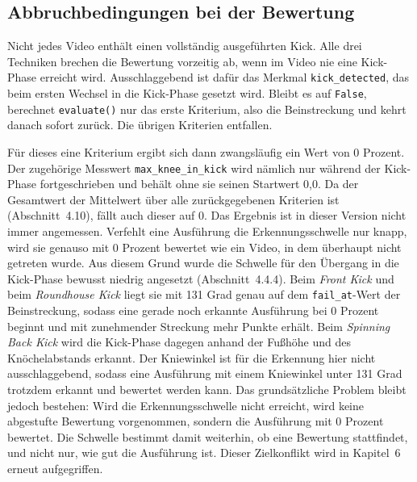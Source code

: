 \documentclass[intern]{cgMA}
\begin{document}
\subsection{Abbruchbedingungen bei der Bewertung}
Nicht jedes Video enthält einen vollständig ausgeführten Kick. Alle drei Techniken brechen die Bewertung vorzeitig ab, wenn im Video nie eine Kick-Phase erreicht wird. Ausschlaggebend ist dafür das Merkmal \texttt{kick\_detected}, das beim ersten Wechsel in die Kick-Phase gesetzt wird. Bleibt es auf \texttt{False}, berechnet \texttt{evaluate()} nur das erste Kriterium, also die Beinstreckung und kehrt danach sofort zurück. Die übrigen Kriterien entfallen.

Für dieses eine Kriterium ergibt sich dann zwangsläufig ein Wert von 0 Prozent. Der zugehörige Messwert \texttt{max\_knee\_in\_kick} wird nämlich nur während der Kick-Phase fortgeschrieben und behält ohne sie seinen Startwert 0,0. Da der Gesamtwert der Mittelwert über alle zurückgegebenen Kriterien ist (Abschnitt~4.10), fällt auch dieser auf 0.
Das Ergebnis ist in dieser Version nicht immer angemessen. Verfehlt eine Ausführung die Erkennungsschwelle nur knapp, wird sie genauso mit 0 Prozent bewertet wie ein Video, in dem überhaupt nicht getreten wurde. Aus diesem Grund wurde die Schwelle für den Übergang in die Kick-Phase bewusst niedrig angesetzt (Abschnitt~4.4.4). Beim \textit{Front Kick} und beim \textit{Roundhouse Kick} liegt sie mit 131 Grad genau auf dem \texttt{fail\_at}-Wert der Beinstreckung, sodass eine gerade noch erkannte Ausführung bei 0 Prozent beginnt und mit zunehmender Streckung mehr Punkte erhält. 
Beim \textit{Spinning Back Kick} wird die Kick-Phase dagegen anhand der Fußhöhe und des Knöchelabstands erkannt. Der Kniewinkel ist für die Erkennung hier nicht ausschlaggebend, sodass eine Ausführung mit einem Kniewinkel unter 131 Grad trotzdem erkannt und bewertet werden kann. Das grundsätzliche Problem bleibt jedoch bestehen: Wird die Erkennungsschwelle nicht erreicht, wird keine abgestufte Bewertung vorgenommen, sondern die Ausführung mit 0 Prozent bewertet. Die Schwelle bestimmt damit weiterhin, ob eine Bewertung stattfindet, und nicht nur, wie gut die Ausführung ist. Dieser Zielkonflikt wird in Kapitel~6 erneut aufgegriffen.
\end{document}
